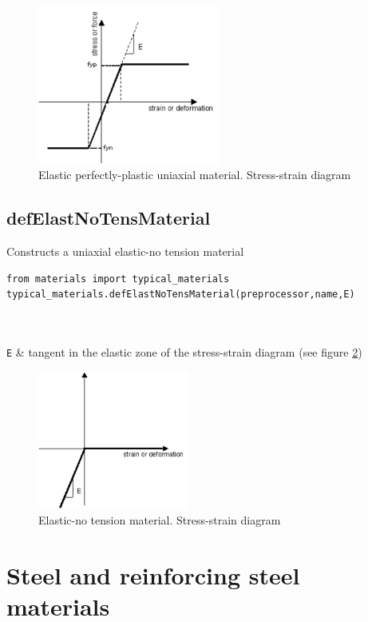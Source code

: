 \begin{figure}[h]
\centering
\includegraphics[width=60mm]{materials/figures/ElasticPP}
\caption{Elastic perfectly-plastic uniaxial material. Stress-strain diagram}\label{ElasticPP}
\end{figure}

\subsection{defElastNoTensMaterial}
\noindent Constructs a uniaxial elastic-no tension material
\begin{verbatim}
from materials import typical_materials
typical_materials.defElastNoTensMaterial(preprocessor,name,E)
\end{verbatim}
\begin{paramFuncTable}
\preprocessor{} \\
 \\
{\tt E} & tangent in the elastic zone of the stress-strain diagram (see figure \ref{ENT}) \\
\end{paramFuncTable}

\begin{figure}[h]
\centering
\includegraphics[width=50mm]{materials/figures/ENT}
\caption{Elastic-no tension material. Stress-strain diagram}\label{ENT}
\end{figure}

\section{Steel and reinforcing steel materials}
